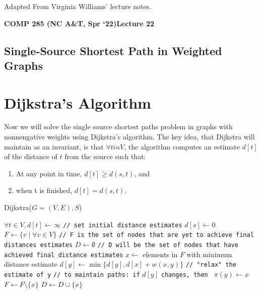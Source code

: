 \documentclass [12pt]{article}
\theoremstyle{definition}
\begin{document}
 

\vspace {1em} 
\begin {Instruction} 
Adapted From Virginia Williams' lecture notes.
\end {Instruction}  

{\LARGE \textbf {COMP 285 (NC A\&T, Spr `22)}\hfill \textbf {Lecture 22} } 

\begin{centering}
\section*{Single-Source Shortest Path in Weighted Graphs}
\end{centering}


\section{Dijkstra's Algorithm}

Now we will solve the single source shortest paths problem in graphs with nonnengative
weights using Dijkstra's algorithm. The key idea, that Dijkstra will maintain as an invariant,
is that $\forall t in V$, the algorithm computes an estimate $d[t]$ of the distance of $t$ from the source such that:

\begin{enumerate}
    \item At any point in time, $d[t] \geq d(s, t)$, and
    \item when t is finished, $d[t] = d(s, t)$.
\end{enumerate}


\begin{algorithm}
\caption{Dijkstra($G= (V,E), S$)}
\label{alg:1}
\begin{algorithmic}
\STATE $\forall t \in V, d[t] \gets \infty$ \texttt{// set initial distance estimates}
\STATE $d[s] \gets 0$
\STATE $F \gets \{v \mid \forall v \in V\}$ \texttt{// F is the set of nodes that are yet to achieve final distances estimates}
\STATE $D \gets \emptyset$ \texttt{// D will be the set of nodes that have achieved final distance estimates}
    \STATE $x \gets$ elements in $F$ with minimum distance estimate
        \STATE $d[y] \gets \min\{d[y], d[x] + w(x,y)\}$ \texttt{// "relax" the estimate of y}
        \STATE \texttt{// to maintain paths: if} $d[y]$ \texttt{changes, then } $\pi(y) \gets x$
    \ENDFOR
    \STATE $F \gets F \setminus \{x\}$
    \STATE $D \gets D \cup \{x\}$
\ENDWHILE
\end{algorithmic}
\end{algorithm}
\end{document}
